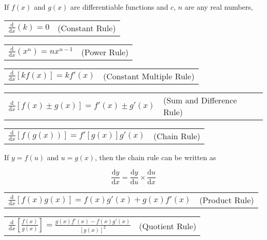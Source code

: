 \documentclass[11pt,a4paper]{book}
\begin{document}
\begin{tcolorbox}[colback=blue!5, colframe=black, boxrule=.4pt, sharpish corners]

If $f(x)$ and $g(x)$ are differentiable functions and $c$, $n$
are any real numbers,

\begin{tasks}[style=itemize,label-width=3.5ex]

\task %
\begin{tabular}{>{\raggedright}p{7cm}>{\raggedright}p{4cm}}
${\displaystyle \frac{\mathrm{d}}{\mathrm{d}x}\left(k\right)=0}$ & (Constant Rule)\tabularnewline
\end{tabular}


\task %
\begin{tabular}{>{\raggedright}p{7cm}>{\raggedright}p{4cm}}
${\displaystyle \frac{\mathrm{d}}{\mathrm{d}x}\left(x^{n}\right)=nx^{n-1}}$ & (Power Rule)\tabularnewline
\end{tabular}

\task %
\begin{tabular}{>{\raggedright}p{7cm}>{\raggedright}p{4cm}}
${\displaystyle \frac{\mathrm{d}}{\mathrm{d}x}\left[kf(x)\right]=kf'(x)}$ & (Constant Multiple Rule)\tabularnewline
\end{tabular}

\task %
\begin{tabular}{>{\raggedright}p{7cm}>{\raggedright}p{5cm}}
${\displaystyle \frac{\mathrm{d}}{\mathrm{d}x}\left[f(x)\pm g(x)\right]=f'(x)\pm g'(x)}$ & (Sum and Difference Rule)\tabularnewline
\end{tabular}

\task  %
\begin{tabular}{>{\raggedright}p{7cm}>{\raggedright}p{4cm}}
${\displaystyle \frac{\mathrm{d}}{\mathrm{d}x}\left[f(g(x))\right]=f'\left[g(x)\right]g'(x)}$ & (Chain Rule)\tabularnewline
\end{tabular}

If $y=f\left(u\right)$ and $u=g\left(x\right)$, then the
chain rule can be written as

\[
\frac{\mathrm{d}y}{\mathrm{d}x}=\frac{\mathrm{d}y}{\mathrm{d}u}\times\frac{\mathrm{d}u}{\mathrm{d}x}
\]

\task  %
\begin{tabular}{>{\raggedright}p{7cm}>{\raggedright}p{4cm}}
${\displaystyle \frac{\mathrm{d}}{\mathrm{d}x}\left[f\left(x\right)g\left(x\right)\right]=f\left(x\right)g'\left(x\right)+g\left(x\right)f'\left(x\right)}$ & (Product Rule)\tabularnewline
\end{tabular}

\task  %
\begin{tabular}{>{\raggedright}p{7cm}>{\raggedright}p{4cm}}
${\displaystyle \frac{\mathrm{d}}{\mathrm{d}x}\left[\frac{f\left(x\right)}{g\left(x\right)}\right]=\frac{g\left(x\right)f'\left(x\right)-f\left(x\right)g'\left(x\right)}{\left[g\left(x\right)\right]^{2}}}$ & (Quotient Rule)\tabularnewline
\end{tabular}

\end{tasks}
\end{tcolorbox}
\end{document}
